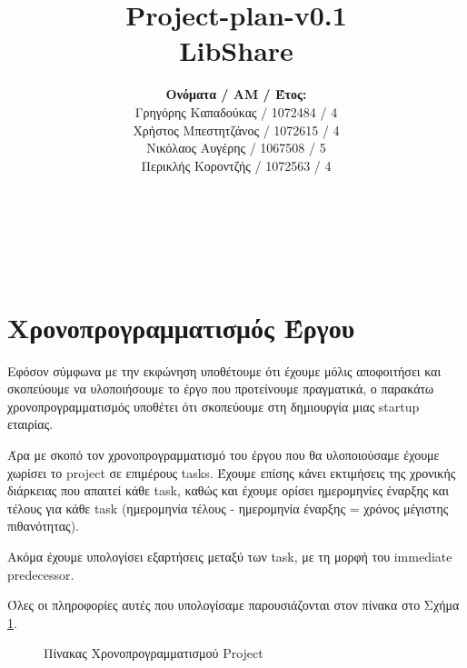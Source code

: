 \documentclass[12pt,a4paper]{article}
\title{Project-plan-v0.1 \\ LibShare}
\author{\textbf{Ονόματα / ΑΜ / Έτος:} \\ Γρηγόρης Καπαδούκας / 1072484 / 4\textdegree \\ Χρήστος Μπεστητζάνος / 1072615 / 4\textdegree \\ Νικόλαος Αυγέρης / 1067508 / 5\textdegree \\ Περικλής Κοροντζής / 1072563 / 4\textdegree}
\begin{document}
\makeatletter
\begin{center}
	\LARGE{\@title} \\
	\pagebreak
\end{center}
\begin{LARGE}\@author\end{LARGE} \\
\pagebreak

\section{Χρονοπρογραμματισμός Έργου}
Εφόσον σύμφωνα με την εκφώνηση υποθέτουμε ότι έχουμε μόλις αποφοιτήσει και σκοπεύουμε να υλοποιήσουμε το έργο που προτείνουμε πραγματικά, ο παρακάτω χρονοπρογραμματισμός υποθέτει ότι σκοπεύουμε στη δημιουργία μιας startup εταιρίας.

Άρα με σκοπό τον χρονοπρογραμματισμό του έργου που θα υλοποιούσαμε έχουμε χωρίσει το project σε επιμέρους tasks. Έχουμε επίσης κάνει εκτιμήσεις της χρονικής διάρκειας που απαιτεί κάθε task, καθώς και έχουμε ορίσει ημερομηνίες έναρξης και τέλους για κάθε task (ημερομηνία τέλους - ημερομηνία έναρξης = χρόνος μέγιστης πιθανότητας).

Ακόμα έχουμε υπολογίσει εξαρτήσεις μεταξύ των task, με τη μορφή του immediate predecessor.

Όλες οι πληροφορίες αυτές που υπολογίσαμε παρουσιάζονται στον πίνακα στο Σχήμα \ref{Πίνακας Χρονοπρογραμματισμού Project}.

\begin{figure}[H]
	\caption{Πίνακας Χρονοπρογραμματισμού Project}
	\label{Πίνακας Χρονοπρογραμματισμού Project}
\end{figure}
\end{document}
